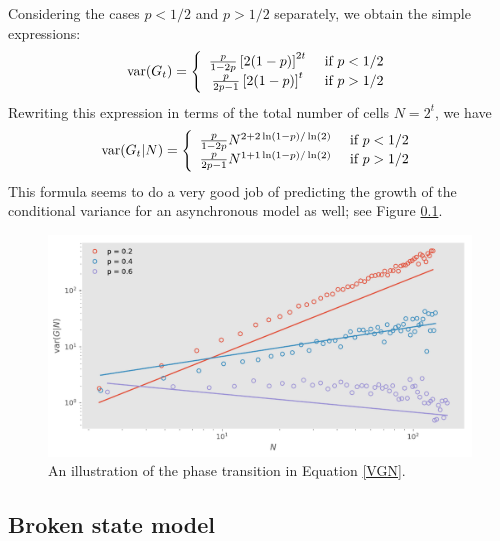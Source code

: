\documentclass{article}
\begin{document}
Considering the cases $p<1/2$ and $p>1/2$ separately, we obtain the simple expressions:  
\begin{equation}
{\rm var}(G_t) = \left\{\begin{array}{cc} 
\frac{p}{1-2p} \left[2(1-p)\right]^{2t}& \text{ if } p<1/2\\
\frac{p}{2p-1} \left[2(1-p)\right]^{t}& \text{ if } p>1/2
\end{array}\right.
\end{equation}
Rewriting this expression in terms of the total number of cells $N = 2^t$, we have
\begin{equation}\label{VGN}
{\rm var}(G_t|N) = \left\{\begin{array}{cc} 
\frac{p}{1-2p} N^{2 + 2 \ln(1-p)/\ln(2)}& \text{ if } p<1/2\\
\frac{p}{2p-1} N^{1+ 1 \ln(1-p)/\ln(2)}& \text{ if } p>1/2
\end{array}\right.
\end{equation}
This formula seems to do a very good job of predicting the growth of the conditional variance for an asynchronous model as well; see Figure \ref{}. 


\begin{figure}[h!]
\centering
\includegraphics[scale=0.6]{figS1.pdf}
\caption{An illustration of the phase transition in Equation \ref{VGN}. }\label{fig:S1}
\end{figure}



\subsection{Broken state model}
\end{document}
